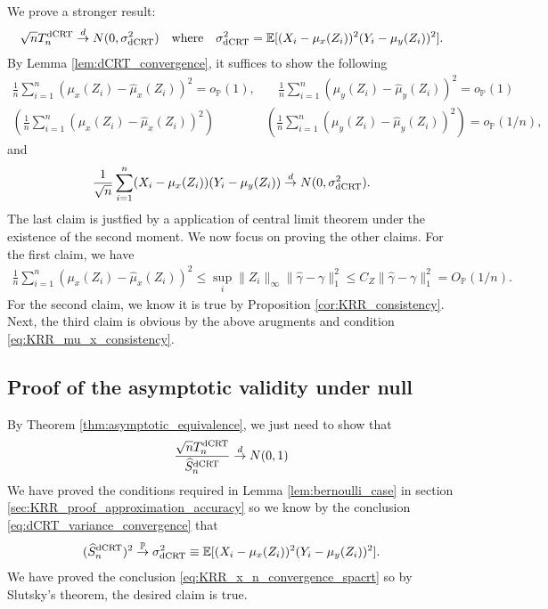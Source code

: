 \documentclass[12pt]{article}
\theoremstyle{definition}
\def\P{\mathbb{P}}
\def\P{\mathbb{P}}
\newcommand{\E}{\mathbb E}								%
\renewcommand{\P}{\mathbb{P}}							%
\newcommand{\convp}{\overset{\mathbb{P}}{\rightarrow}}             %
\newcommand{\convd}{\overset d \rightarrow}             %
\newcommand{\srx}{X}									%
\newcommand{\srz}{Z}									%
\newcommand{\sry}{Y}									%
\newcommand{\dCRT}{\textnormal{dCRT}} 					%
\begin{document}
We prove a stronger result: 
\begin{align}\label{eq:KRR_x_n_convergence_spacrt}
  \sqrt{n}T_n^{\dCRT}\convd N(0,\sigma^2_{\dCRT})\quad\text{where}\quad
  \sigma^2_{\dCRT}=\E[(\srx_i-\mu_x(\srz_i))^2(\sry_i-\mu_y(\srz_i))^2].
\end{align}
By Lemma \ref{lem:dCRT_convergence}, it suffices to show the following 
\begin{align*}
  \frac{1}{n}\sum_{i=1}^n(\mu_x(\srz_i)-\widehat{\mu}_x(\srz_i))^2=o_\P(1),
  &
  \quad\frac{1}{n}\sum_{i=1}^n(\mu_y(\srz_i)-\widehat{\mu}_y(\srz_i))^2=o_\P(1)\\
  \left(\frac{1}{n}\sum_{i=1}^n(\mu_x(\srz_i)-\widehat{\mu}_x(\srz_i))^2\right)
  &
  \left(\frac{1}{n}\sum_{i=1}^n(\mu_y(\srz_i)-\widehat{\mu}_y(\srz_i))^2\right)=o_\P(1/n),
\end{align*}
and 
\begin{align*}
  \frac{1}{\sqrt{n}}\sum_{i=1}^n (\srx_i-\mu_x(\srz_i))(\sry_i-\mu_y(\srz_i))\convd N(0,\sigma^2_{\dCRT}).
\end{align*}
The last claim is justfied by a application of central limit theorem under the existence of the second moment. We now focus on proving the other claims. For the first claim, we have 
\begin{align*}
  \frac{1}{n}\sum_{i=1}^n(\mu_x(\srz_i)-\widehat{\mu}_x(\srz_i))^2\leq \sup_i\|\srz_i\|_{\infty}\|\widehat{\gamma}-\gamma\|_1^2\leq C_Z\|\widehat{\gamma}-\gamma\|_1^2=O_\P(1/n).
\end{align*}
For the second claim, we know it is true by Proposition \ref{cor:KRR_consistency}. Next, the third claim is obvious by the above arugments and condition \eqref{eq:KRR_mu_x_consistency}.



\subsection{Proof of the asymptotic validity under null}\label{sec:KRR_proof_validity_under_null}

By Theorem \ref{thm:asymptotic_equivalence}, we just need to show that 
\begin{align*}
  \frac{\sqrt{n}T_n^{\dCRT}}{\widehat{S}_n^{\dCRT}}\convd N(0,1)
\end{align*}
We have proved the conditions required in Lemma \ref{lem:bernoulli_case} in section \ref{sec:KRR_proof_approximation_accuracy} so we know by the conclusion \eqref{eq:dCRT_variance_convergence} that 
\begin{align*}
  (\widehat S_n^{\dCRT})^2\convp \sigma_{\dCRT}^2\equiv \E[(\srx_i-\mu_x(\srz_i))^2(\sry_i-\mu_y(\srz_i))^2].
\end{align*}
We have proved the conclusion \eqref{eq:KRR_x_n_convergence_spacrt} so by Slutsky's theorem, the desired claim is true.
\end{document}
